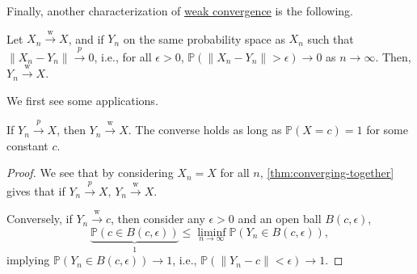 Finally, another characterization of \hyperref[def:weak-convergence]{weak convergence} is the following.

\begin{theorem}\label{thm:converging-together}
	Let \(X_n \overset{\text{w} }{\to } X\), and if \(Y_n\) on the same probability space as \(X_n\) such that \(\lVert X_n - Y_n \rVert \overset{p}{\to } 0\), i.e., for all \(\epsilon > 0\), \(\mathbb{P} (\lVert X_n - Y_n \rVert > \epsilon ) \to 0\) as \(n \to \infty\). Then, \(Y_n \overset{\text{w} }{\to } X\).
\end{theorem}

We first see some applications.

\begin{corollary}
	If \(Y_n \overset{p}{\to } X\), then \(Y_n \overset{\text{w} }{\to } X\). The converse holds as long as \(\mathbb{P} (X = c) = 1\) for some constant \(c\).
\end{corollary}
\begin{proof}
	We see that by considering \(X_n = X\) for all \(n\), \autoref{thm:converging-together} gives that if \(Y_n \overset{p}{\to } X\), \(Y_n \overset{\text{w} }{\to } X\).

	Conversely, if \(Y_n \overset{\text{w} }{\to } c\), then consider any \(\epsilon > 0\) and an open ball \(B(c, \epsilon )\),
	\[
		\underbrace{\mathbb{P} (c \in B(c, \epsilon ))}_{1}
		\leq \liminf_{n \to \infty} \mathbb{P} (Y_n \in B(c, \epsilon )),
	\]
	implying \(\mathbb{P} (Y_n \in B(c, \epsilon )) \to 1\), i.e., \(\mathbb{P} (\lVert Y_n - c \rVert < \epsilon ) \to 1\).
\end{proof}